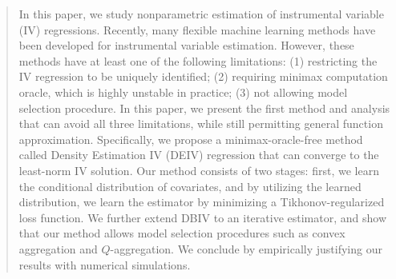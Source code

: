 \documentclass{article}
\theoremstyle{plain}
\theoremstyle{definition}
\theoremstyle{remark}
\begin{document}
\newcommand*{\zero}{{\textbf 0}}
\newcommand*{\one}{{\textbf 1}}

\newcommand*{\Risk}{{\rm Risk}}
\newcommand*{\Bias}{{\rm Bias}}

\newcommand{\pen}{{\rm pen}}
\newcommand{\diag}{{\rm diag}}
\newcommand{\rank}{{\rm rank}}

\def\iid{{\it i.i.d.}}
\renewcommand{\arraystretch}{2.}


\begin{abstract}
In this paper, we study nonparametric estimation of instrumental variable (IV) regressions. Recently, many
flexible machine learning methods have been developed for instrumental variable estimation. However, these
methods have at least one of the following limitations:  (1) restricting the IV regression to be uniquely identified; (2) requiring minimax computation oracle, which is highly unstable in practice; (3) not allowing model selection procedure.  In this paper, we present the first method and analysis that can avoid all three limitations, while still permitting general function approximation. Specifically, we propose a minimax-oracle-free method called Density Estimation IV (DEIV) regression that can converge to the least-norm IV solution. Our method consists of two stages: first, we learn the conditional distribution of covariates, and by utilizing the learned distribution,  we learn the estimator by minimizing a Tikhonov-regularized loss function. We further extend DBIV to an iterative estimator, and show that our method allows model selection procedures such as convex aggregation and $Q$-aggregation. We conclude by empirically justifying our results with numerical simulations.
\end{abstract}
















\newpage
\appendix
\onecolumn




\end{document}
